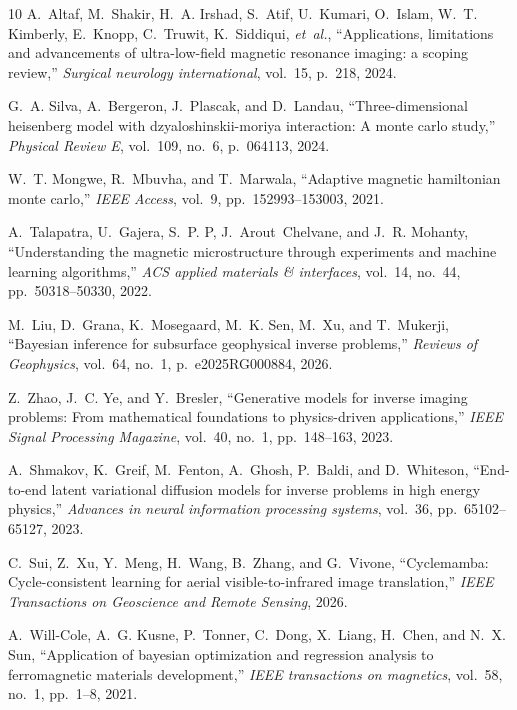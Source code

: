 \documentclass[final,5p,times,twocolumn]{elsarticle}
\begin{document}
\begin{thebibliography}{10}
A.~Altaf, M.~Shakir, H.~A. Irshad, S.~Atif, U.~Kumari, O.~Islam, W.~T. Kimberly, E.~Knopp, C.~Truwit, K.~Siddiqui, {\em et~al.}, ``Applications, limitations and advancements of ultra-low-field magnetic resonance imaging: a scoping review,'' {\em Surgical neurology international}, vol.~15, p.~218, 2024.

G.~A. Silva, A.~Bergeron, J.~Plascak, and D.~Landau, ``Three-dimensional heisenberg model with dzyaloshinskii-moriya interaction: A monte carlo study,'' {\em Physical Review E}, vol.~109, no.~6, p.~064113, 2024.

W.~T. Mongwe, R.~Mbuvha, and T.~Marwala, ``Adaptive magnetic hamiltonian monte carlo,'' {\em IEEE Access}, vol.~9, pp.~152993--153003, 2021.

A.~Talapatra, U.~Gajera, S.~P. P, J.~Arout~Chelvane, and J.~R. Mohanty, ``Understanding the magnetic microstructure through experiments and machine learning algorithms,'' {\em ACS applied materials \& interfaces}, vol.~14, no.~44, pp.~50318--50330, 2022.

M.~Liu, D.~Grana, K.~Mosegaard, M.~K. Sen, M.~Xu, and T.~Mukerji, ``Bayesian inference for subsurface geophysical inverse problems,'' {\em Reviews of Geophysics}, vol.~64, no.~1, p.~e2025RG000884, 2026.

Z.~Zhao, J.~C. Ye, and Y.~Bresler, ``Generative models for inverse imaging problems: From mathematical foundations to physics-driven applications,'' {\em IEEE Signal Processing Magazine}, vol.~40, no.~1, pp.~148--163, 2023.

A.~Shmakov, K.~Greif, M.~Fenton, A.~Ghosh, P.~Baldi, and D.~Whiteson, ``End-to-end latent variational diffusion models for inverse problems in high energy physics,'' {\em Advances in neural information processing systems}, vol.~36, pp.~65102--65127, 2023.

C.~Sui, Z.~Xu, Y.~Meng, H.~Wang, B.~Zhang, and G.~Vivone, ``Cyclemamba: Cycle-consistent learning for aerial visible-to-infrared image translation,'' {\em IEEE Transactions on Geoscience and Remote Sensing}, 2026.

A.~Will-Cole, A.~G. Kusne, P.~Tonner, C.~Dong, X.~Liang, H.~Chen, and N.~X. Sun, ``Application of bayesian optimization and regression analysis to ferromagnetic materials development,'' {\em IEEE transactions on magnetics}, vol.~58, no.~1, pp.~1--8, 2021.


\end{thebibliography}
\end{document}
